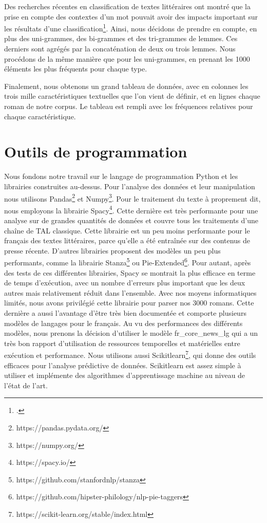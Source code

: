 Des recherches récentes en classification de textes littéraires ont montré que la prise en compte des contextes d'un mot pouvait avoir des impacts important sur les résultats d'une classification\footcites{van_cranenburgh_identifying_2015}. Ainsi, nous décidons de prendre en compte, en plus des uni-grammes, des bi-grammes et des tri-grammes de lemmes. Ces derniers sont agrégés par la concaténation de deux ou trois lemmes. Nous procédons de la même manière que pour les uni-grammes, en prenant les 1000 éléments les plus fréquents pour chaque type.

Finalement, nous obtenons un grand tableau de données, avec en colonnes les trois mille caractéristiques textuelles que l'on vient de définir, et en lignes chaque roman de notre corpus. Le tableau est rempli avec les fréquences relatives pour chaque caractéristique.  

\section{Outils de programmation}

Nous fondons notre travail sur le langage de programmation Python et les librairies construites au-dessus. Pour l'analyse des données et leur manipulation nous utilisons Pandas\footnote{https://pandas.pydata.org/} et Numpy\footnote{https://numpy.org/}. Pour le traitement du texte à proprement dit, nous employons la librairie Spacy\footnote{https://spacy.io/}. Cette dernière est très performante pour une analyse sur de grandes quantités de données et couvre tous les traitements d'une chaîne de TAL classique. Cette librairie est un peu moins performante pour le français des textes littéraires, parce qu'elle a été entraînée sur des contenus de presse récente. D'autres librairies proposent des modèles un peu plus performants, comme la librairie Stanza\footnote{https://github.com/stanfordnlp/stanza} ou Pie-Extended\footnote{https://github.com/hipster-philology/nlp-pie-taggers}. Pour autant, après des tests de ces différentes librairies, Spacy se montrait la plus efficace en terme de temps d'exécution, avec un nombre d'erreurs plus important que les deux autres mais relativement réduit dans l'ensemble. Avec nos moyens informatiques limités, nous avons privilégié cette librairie pour parser nos 3000 romans. Cette dernière a aussi l'avantage d'être très bien documentée et comporte plusieurs modèles de langages pour le français. Au vu des performances des différents modèles, nous prenons la décision d'utiliser le modèle fr\_core\_news\_lg qui a un très bon rapport d'utilisation de ressources temporelles et matérielles entre exécution et performance. Nous utilisons aussi Scikitlearn\footnote{https://scikit-learn.org/stable/index.html}, qui donne des outils efficaces pour l'analyse prédictive de données. Scikitlearn est assez simple à utiliser et implémente des algorithmes d'apprentissage machine au niveau de l'état de l'art.

